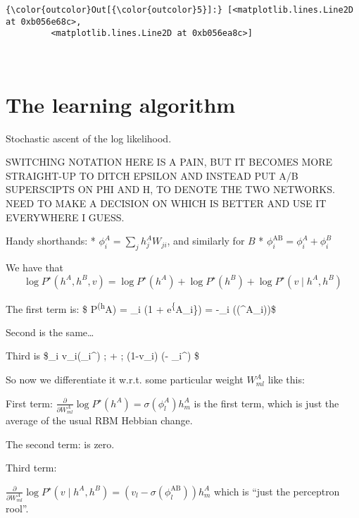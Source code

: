 \documentclass{article}
\begin{document}
            \begin{Verbatim}[commandchars=\\\{\}]
{\color{outcolor}Out[{\color{outcolor}5}]:} [<matplotlib.lines.Line2D at 0xb056e68c>,
         <matplotlib.lines.Line2D at 0xb056ea8c>]
\end{Verbatim}
        
    \begin{center}
    \end{center}
    { \hspace*{\fill} \\}
    
    \section{The learning algorithm}\label{the-learning-algorithm}

Stochastic ascent of the log likelihood.

SWITCHING NOTATION HERE IS A PAIN, BUT IT BECOMES MORE STRAIGHT-UP TO
DITCH EPSILON AND INSTEAD PUT A/B SUPERSCIPTS ON PHI AND H, TO DENOTE
THE TWO NETWORKS. NEED TO MAKE A DECISION ON WHICH IS BETTER AND USE IT
EVERYWHERE I GUESS.

Handy shorthands: * \(\phi_i^A = \sum_j h_j^A W_{ji}\), and similarly
for \(B\) * \(\phi_i^\text{AB} = \phi_i^A + \phi_i^B\)

We have that \[
\log P^\star(h^A, h^B, v) = \log P^\star(h^A) + \log P^\star(h^B) + \log P^\star(v \mid h^A, h^B)
\]

The first term is: \$ \log P\textsuperscript{\star(h}A) = \sum\_i
\log (1 + e\textsuperscript{\{\phi}A\_i\}) = -\sum\_i
\log (\sigma(\phi\^{}A\_i))\$

Second is the same\ldots{}

Third is \$\sum\_i v\_i\log \sigma(\phi\_i\^{}) ; + ; (1-v\_i)
\log \sigma(- \phi\_i\^{}) \$

So now we differentiate it w.r.t. some particular weight \(W_{ml}^A\)
like this:

First term:
\(\frac{\partial}{\partial W_{ml}^A} \log P^\star(h^A) = \sigma(\phi^A_l) h_m^A\)
is the first term, which is just the average of the usual RBM Hebbian
change.

The second term: is zero.

Third term:

\(\frac{\partial}{\partial W_{ml}^A} \log P^\star(v \mid h^A, h^B) = (v_l-\sigma(\phi_l^\text{AB})) h_m^A\)
which is ``just the perceptron rool''.
\end{document}
